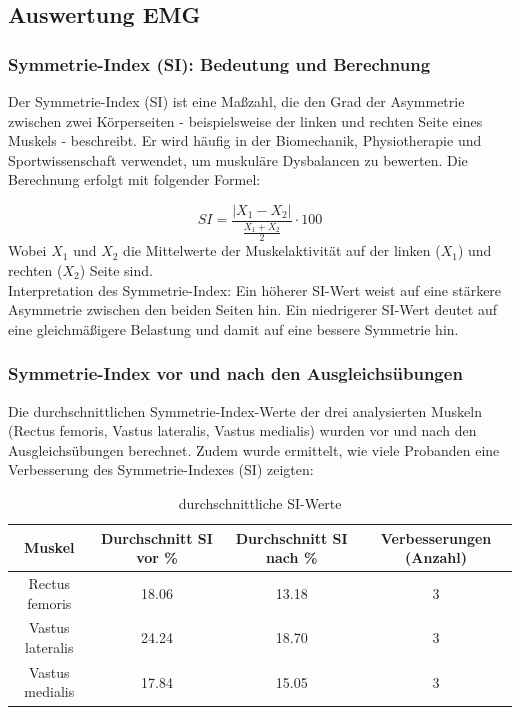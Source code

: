 \subsection{Auswertung EMG}
\subsubsection{Symmetrie-Index (SI): Bedeutung und Berechnung}

Der Symmetrie-Index (SI) ist eine Maßzahl, die den Grad der Asymmetrie zwischen zwei Körperseiten - beispielsweise der linken und rechten Seite eines Muskels - beschreibt. Er wird häufig in der Biomechanik, Physiotherapie und Sportwissenschaft verwendet, um muskuläre Dysbalancen zu bewerten.
Die Berechnung erfolgt mit folgender Formel:

\begin{equation}
    SI = \frac{|X_1 - X_2|}{\frac{X_1 + X_2}{2}} \cdot 100
\end{equation}
Wobei $X_1$ und $X_2$ die Mittelwerte der Muskelaktivität auf der linken ($X_1$) und rechten ($X_2$) Seite sind.
\\
Interpretation des Symmetrie-Index:
Ein höherer SI-Wert weist auf eine stärkere Asymmetrie zwischen den beiden Seiten hin.
Ein niedrigerer SI-Wert deutet auf eine gleichmäßigere Belastung und damit auf eine bessere Symmetrie hin.

\subsubsection{Symmetrie-Index vor und nach den Ausgleichsübungen}

Die durchschnittlichen Symmetrie-Index-Werte der drei analysierten Muskeln (Rectus femoris, Vastus lateralis, Vastus medialis) wurden vor und nach den Ausgleichsübungen berechnet. Zudem wurde ermittelt, wie viele Probanden eine Verbesserung des Symmetrie-Indexes (SI) zeigten:

\begin{table}[htbp]
  \centering
    \begin{tabular}{|c|c|c|c|}
    \hline
    \textbf{Muskel} & \textbf{Durchschnitt SI vor \%} & \textbf{Durchschnitt SI nach \%} & {\textbf{Verbesserungen (Anzahl)}} \\
    \hline
    Rectus femoris & \multicolumn{1}{c|}{18.06} & 13.18 & 3 \\
    \hline
    Vastus lateralis & 24.24 & 18.70 & 3 \\
    \hline
    Vastus medialis & 17.84 & 15.05 & 3 \\
    \hline
    \end{tabular}%
    \caption{durchschnittliche SI-Werte}
  \label{tab:durchschnittliche-SI-Werte}%
\end{table}%

